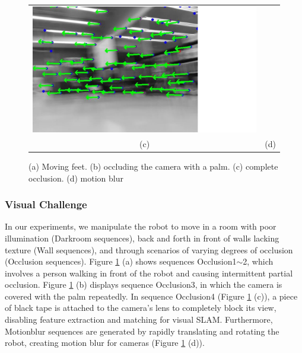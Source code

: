 \documentclass[conference]{IEEEtran}
\begin{document}
\begin{figure}
\begin{center}
\begin{tabular}{cc}
				\includegraphics[scale=0.11]{fig/motionblur.pdf}
				
				\\
				  (c) & (d)\\
			
		
			\end{tabular}
		\end{center}
		\caption{(a) Moving feet. (b) occluding the camera with a palm. (c) complete occlusion. (d) motion blur   }
		\label{occlusion}
	\end{figure}


	
	
	
	\subsubsection{Visual Challenge}
	In our experiments, we manipulate the robot to move in a room with poor illumination (Darkroom sequences), back and forth in front of walls lacking texture (Wall sequences), and through scenarios of varying degrees of occlusion (Occlusion sequences). Figure \ref{occlusion} (a) shows sequences Occlusion1$\sim$2, which involves a person walking in front of the robot and causing intermittent partial occlusion. Figure \ref{occlusion} (b) displays sequence Occlusion3, in which the camera is covered with the palm repeatedly. In sequence Occlusion4 (Figure \ref{occlusion} (c)), a piece of black tape is attached to the camera's lens to completely block its view, disabling feature extraction and matching for visual SLAM. Furthermore, Motionblur sequences are generated by rapidly translating and rotating the robot, creating motion blur for cameras (Figure \ref{occlusion} (d)).
	
\end{document}
